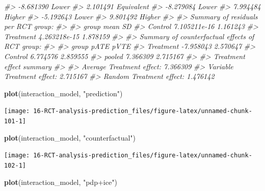 \documentclass[
]{book}
\newenvironment{Shaded}{\begin{snugshade}}{\end{snugshade}}
\newcommand{\CommentTok}[1]{\textcolor[rgb]{0.56,0.35,0.01}{\textit{#1}}}
\newcommand{\KeywordTok}[1]{\textcolor[rgb]{0.13,0.29,0.53}{\textbf{#1}}}
\newcommand{\NormalTok}[1]{#1}
\newcommand{\StringTok}[1]{\textcolor[rgb]{0.31,0.60,0.02}{#1}}
\begin{document}
\begin{Shaded}
\begin{Highlighting}[]
\CommentTok{\#>   {-}8.681390          Lower}
\CommentTok{\#>    2.101491     Equivalent}
\CommentTok{\#>   {-}8.279084          Lower}
\CommentTok{\#>    7.994484         Higher}
\CommentTok{\#>   {-}5.192643          Lower}
\CommentTok{\#>    9.801492         Higher}
\CommentTok{\#> }
\CommentTok{\#> Summary of residuals per RCT group:}
\CommentTok{\#> }
\CommentTok{\#>      group         mean       SD}
\CommentTok{\#>    Control 7.105211e{-}16 1.161243}
\CommentTok{\#>  Treatment 4.263218e{-}15 1.878159}
\CommentTok{\#> }
\CommentTok{\#> Summary of counterfactual effects of RCT group:}
\CommentTok{\#> }
\CommentTok{\#>      group      pATE     pVTE}
\CommentTok{\#>  Treatment {-}7.958043 2.570647}
\CommentTok{\#>    Control  6.774576 2.859555}
\CommentTok{\#>     pooled  7.366309 2.715167}
\CommentTok{\#> }
\CommentTok{\#> Treatment effect summary}
\CommentTok{\#> }
\CommentTok{\#> Average Treatment effect:  7.366309}
\CommentTok{\#> Variable Treatment effect:  2.715167}
\CommentTok{\#> Random Treatment effect:  1.476142}
\end{Highlighting}
\end{Shaded}

\begin{Shaded}
\begin{Highlighting}[]
\KeywordTok{plot}\NormalTok{(interaction\_model, }\StringTok{"prediction"}\NormalTok{)}
\end{Highlighting}
\end{Shaded}

\begin{center}\texttt{[image: 16-RCT-analysis-prediction\_files/figure-latex/unnamed-chunk-101-1]} \end{center}

\begin{Shaded}
\begin{Highlighting}[]
\KeywordTok{plot}\NormalTok{(interaction\_model, }\StringTok{"counterfactual"}\NormalTok{)}
\end{Highlighting}
\end{Shaded}

\begin{center}\texttt{[image: 16-RCT-analysis-prediction\_files/figure-latex/unnamed-chunk-102-1]} \end{center}

\begin{Shaded}
\begin{Highlighting}[]
\KeywordTok{plot}\NormalTok{(interaction\_model, }\StringTok{"pdp+ice"}\NormalTok{)}
\end{Highlighting}
\end{Shaded}
\end{document}
